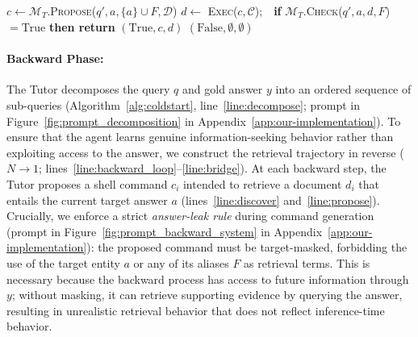 \documentclass{article} %
\begin{document}
\begin{algorithm*}[!t]
\begin{algorithmic}[1]
\Statex
{}  \label{line:func_discover}
     \label{line:refine_loop}
        \State $c \gets \mathcal{M}_{T}.$\textsc{Propose}($q', a, \{a\} \cup F, \mathcal{D}$)  \label{line:propose}
        \State $d \gets$ \textsc{Exec}($c, \mathcal{C}$);\ \ \textbf{if} $\mathcal{M}_{T}.$\textsc{Check}($q', a, d, F$) $= \mathrm{True}$ \textbf{then return} $(\mathrm{True}, c, d)$ \label{line:exec_check}
    \EndFor
    \State \Return $(\mathrm{False}, \emptyset, \emptyset)$ \label{line:return_fail}
\EndFunction
\end{algorithmic}
\end{algorithm*}

\paragraph{Backward Phase:}

The Tutor decomposes the query $q$ and gold answer $y$ into an ordered sequence of sub-queries (Algorithm~\ref{alg:coldstart}, line~\ref{line:decompose}; prompt in Figure~\ref{fig:prompt_decomposition} in Appendix~\ref{app:our-implementation}). To ensure that the agent learns genuine information-seeking behavior rather than exploiting access to the answer, we construct the retrieval trajectory in reverse ($N \rightarrow 1$; lines~\ref{line:backward_loop}--\ref{line:bridge}). At each backward step, the Tutor proposes a shell command $c_i$ intended to retrieve a document $d_i$ that entails the current target answer $a$ (lines~\ref{line:discover} and~\ref{line:propose}). Crucially, we enforce a strict \textit{answer-leak rule} during command generation (prompt in Figure~\ref{fig:prompt_backward_system} in Appendix~\ref{app:our-implementation}): the proposed command must be target-masked, forbidding the use of the target entity $a$ or any of its aliases $F$ as retrieval terms. This is necessary because the backward process has access to future information through $y$; without masking, it can retrieve supporting evidence by querying the answer, resulting in unrealistic retrieval behavior that does not reflect inference-time behavior. 
\end{document}

